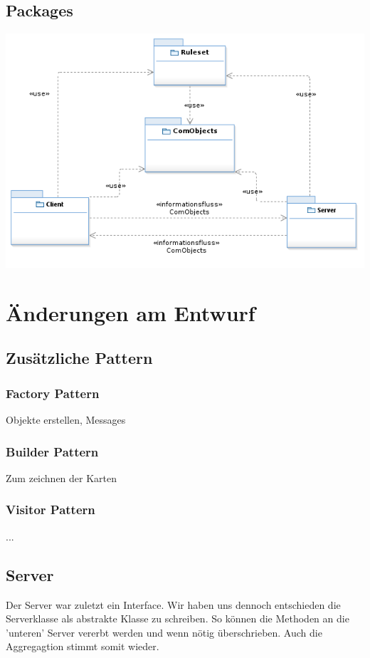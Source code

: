 \documentclass{article}
\begin{document}
\subsection{Packages}
\includegraphics[width=\textwidth]{Packages}
\newpage

\section{Änderungen am Entwurf}
\subsection{Zusätzliche Pattern}
\subsubsection{Factory Pattern}
Objekte erstellen, Messages
\subsubsection{Builder Pattern}
Zum zeichnen der Karten
\subsubsection{Visitor Pattern}
...

\subsection{Server}
Der Server war zuletzt ein Interface. Wir haben uns dennoch entschieden die Serverklasse als abstrakte Klasse zu schreiben. So können die Methoden an die 'unteren' Server vererbt werden und wenn nötig überschrieben. Auch die Aggregagtion stimmt somit wieder.
\subsection{}
\end{document}
